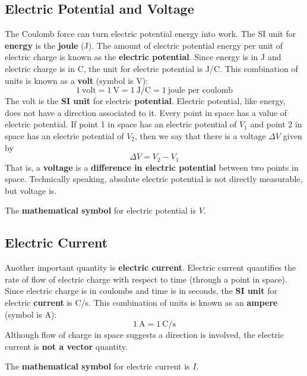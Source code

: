 \subsection{Electric Potential and Voltage}
%
The Coulomb force can turn electric potential energy into work. The SI unit for \textbf{energy} is the \textbf{joule} (J). The amount of electric potential energy per unit of electric charge is known as the \textbf{electric potential}. Since energy is in J and electric charge is in C, the unit for electric potential is J/C. This combination of units is known as a \textbf{volt} (symbol is V):
\begin{equation}
	1 \ \text{volt} = 1 \ \text{V} = 1 \ \text{J/C} = 1 \ \text{joule per coulomb}
\end{equation}
The volt is the \textbf{SI unit} for electric \textbf{potential}. Electric potential, like energy, does not have a direction associated to it. Every point in space has a value of electric potential. If point 1 in space has an electric potential of $V_{1}$ and point 2 in space has an electric potential of $V_{2}$, then we say that there is a voltage $\Delta V$ given by
\begin{equation}
	\Delta V = V_{2} - V_{1}
\end{equation}
That is, a \textbf{voltage} is a \textbf{difference in electric potential} between two points in space. Technically speaking, absolute electric potential is not directly measurable, but voltage is.

The \textbf{mathematical symbol} for electric potential is $V$.
%
\subsection{Electric Current}
%
Another important quantity is \textbf{electric current}. Electric current quantifies the rate of flow of electric charge with respect to time (through a point in space). Since electric charge is in coulombs and time is in seconds, the \textbf{SI unit} for electric \textbf{current} is C/s. This combination of units is known as an \textbf{ampere} (symbol is A):
\begin{equation}
	1 \ \text{A} = 1 \ \text{C/s}
\end{equation}
Although flow of charge in space suggests a direction is involved, the electric current is \textbf{not a vector} quantity.

The \textbf{mathematical symbol} for electric current is $I$.
%
